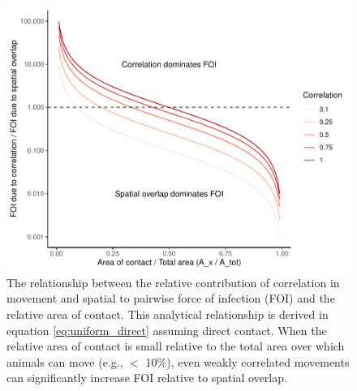 ﻿\documentclass[11pt]{article}
\begin{document}
\begin{figure}
    \includegraphics[width=\textwidth]{figures/correlation_analytical_figure.pdf}
    \caption{The relationship between the relative contribution of correlation in movement and spatial to pairwise force of infection (FOI) and the relative area of contact. This analytical relationship is derived in equation \ref{eq:uniform_direct} assuming direct contact.  When the relative area of contact is small relative to the total area over which animals can move (e.g., $<$ 10\%), even weakly correlated movements can significantly increase FOI relative to spatial overlap.}
    \label{fig:analytical_corr}
\end{figure}
\end{document}
